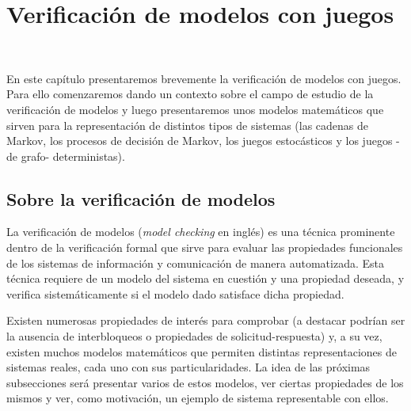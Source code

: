 \chapter{Verificación de modelos con juegos}
~\label{cap:modelos}
\vspace{-1cm}

En este capítulo presentaremos brevemente la verificación de modelos con
juegos. Para ello comenzaremos dando un contexto sobre el campo de estudio de
la verificación de modelos y luego presentaremos unos modelos matemáticos que
sirven para la representación de distintos tipos de sistemas (las cadenas de
Markov, los procesos de decisión de Markov, los juegos estocásticos y los
juegos -de grafo- deterministas).


\section{Sobre la verificación de modelos}

La verificación de modelos (\textit{model checking} en inglés) es una técnica
prominente dentro de la verificación formal que sirve para evaluar las
propiedades funcionales de los sistemas de información y comunicación de manera
automatizada. Esta técnica requiere de un modelo del sistema en cuestión y una
propiedad deseada, y verifica sistemáticamente si el modelo dado satisface
dicha propiedad.

Existen numerosas propiedades de interés para comprobar (a destacar podrían ser
la ausencia de interbloqueos o propiedades de solicitud-respuesta) y, a su vez,
existen muchos modelos matemáticos que permiten distintas representaciones de
sistemas reales, cada uno con sus particularidades. La idea de las próximas
subsecciones será presentar varios de estos modelos, ver ciertas propiedades de
los mismos y ver, como motivación, un ejemplo de sistema representable con
ellos.

